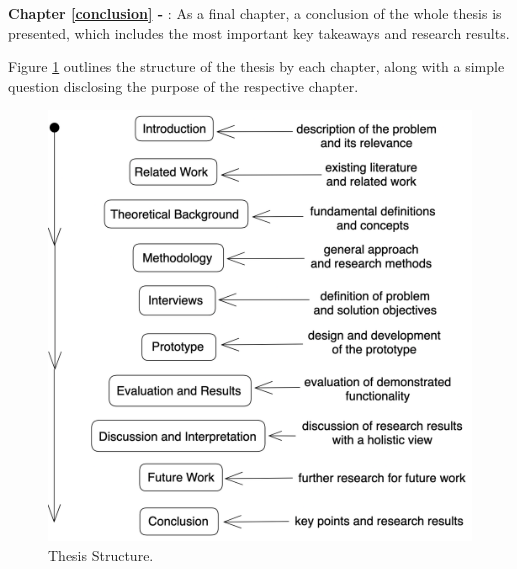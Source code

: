 \textbf{Chapter \ref{conclusion} - }:
As a final chapter, a conclusion of the whole thesis is presented,
which includes the most important key takeaways and research results.


Figure \ref{fig:thesis-structure-simple-overview} outlines the structure of the thesis
by each chapter,
along with a simple question disclosing the purpose of the respective chapter.

\begin{figure}[h]
	\centering
	\includegraphics[width=.99\linewidth]{assets/thesis-structure-simple-overview.png}
	\caption{Thesis Structure.
	}
	\label{fig:thesis-structure-simple-overview}	
\end{figure}





















%


